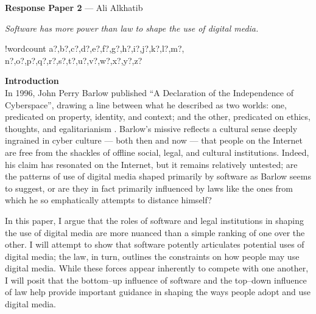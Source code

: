 \documentclass[11pt]{article}
\newcounter{words}
\newenvironment{counted}{%
  \setcounter{words}{0}
  \SearchList!{wordcount}{\stepcounter{words}}
    {a?,b?,c?,d?,e?,f?,g?,h?,i?,j?,k?,l?,m?,
    n?,o?,p?,q?,r?,s?,t?,u?,v?,w?,x?,y?,z?}
  \UndoBoundary{'}
  \SearchOrder{p;}}{%
  \StopSearching}
\newcommand{\sectitle}[1]{\textbf{#1}\\}
\begin{document}
  \begin{center}
  \large{\bf Response Paper 2} --- 
  Ali Alkhatib
  \end{center}

\textit{Software has more power than law to shape the use of digital media.}


\begin{counted}

\sectitle{Introduction}
In 1996, John Perry Barlow published ``A Declaration of the Independence of Cyberspace'',
drawing a line between what he described as two worlds:
one, predicated on property, identity, and context;
and the other, predicated on ethics, thoughts, and egalitarianism
\cite{barlow2009declaration}.
Barlow's missive reflects a cultural sense deeply ingrained in cyber culture
--- both then and now ---
that people on the Internet are free from the shackles of offline social, legal, and cultural institutions.
Indeed, his claim has resonated on the Internet, but it remains relatively untested;
are the patterns of use of digital media shaped primarily by software as Barlow seems to suggest,
or are they in fact primarily influenced by laws like the ones from which he so emphatically attempts to distance himself?

In this paper, I argue that the roles of software and legal institutions in shaping the use of digital media are more nuanced than a simple ranking of one over the other.
I will attempt to show that software potently articulates potential uses of digital media;
the law, in turn, outlines the constraints on how people may use digital media.
While these forces appear inherently to compete with one another,
I will posit that the bottom--up influence of software
and the top--down influence of law
help provide important guidance in shaping the ways people adopt and use digital media.



\end{counted}
\end{document}
